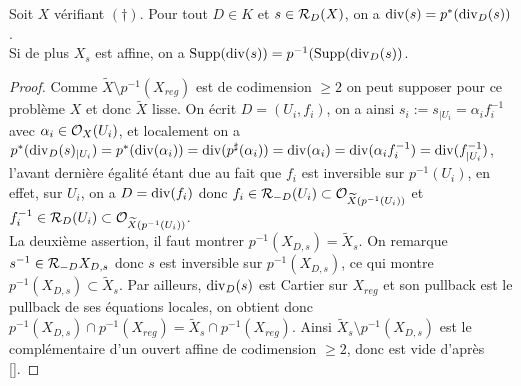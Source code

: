 \begin{prop}\label{pstarprincipal}
Soit $X$ vérifiant $(\dagger)$. Pour tout $D\in K$ et $s\in\mathcal{R}_D(X)$, on a $\operatorname{div}(s)=p^*(\operatorname{div}_D(s))$.\\ Si de plus $X_s$ est affine, on a $\operatorname{Supp}(\operatorname{div}(s))=p^{-1}(\operatorname{Supp}(\operatorname{div}_D(s))$.
\end{prop}
\begin{proof}
Comme $\widetilde{X}\setminus p^{-1}(X_{reg})$ est de codimension $\geq 2$ on peut supposer pour ce problème $X$ et donc $\widetilde{X}$ lisse. On écrit $D=(U_i, f_i)$, on a ainsi $s_i:=s_{|U_i}=\alpha_i f_i^{-1}$ avec $\alpha_i\in \mathcal{O}_X(U_i)$, et localement on a $p^*(\operatorname{div}_D(s)_{|U_i})=p^*(\operatorname{div}(\alpha_i))=\operatorname{div}(p^\sharp(\alpha_i))=\operatorname{div}(\alpha_i)=\operatorname{div}(\alpha_i f_i^{-1})=\operatorname{div}(f^{-1}_{|U_i})$, l'avant dernière égalité étant due au fait que $f_i$ est inversible sur $p^{-1}(U_i)$, en effet, sur $U_i$, on a $D=\operatorname{div}(f_i)$ donc $f_i\in \mathcal{R}_{-D}(U_i)\subset\mathcal{O}_{\widetilde{X}(p^{-1}(U_i))}$ et $f_i^{-1}\in \mathcal{R}_D(U_i)\subset\mathcal{O}_{\widetilde{X}(p^{-1}(U_i))}$.\\
La deuxième assertion, il faut montrer $p^{-1}(X_{D,s})=\widetilde{X}_s$. On remarque $s^{-1}\in \mathcal{R}_{-D}{X_{D,s}}$ donc $s$ est inversible sur $p^{-1}(X_{D,s})$, ce qui montre $p^{-1}(X_{D,s})\subset \widetilde{X}_s$. Par ailleurs, $\operatorname{div}_D(s)$ est Cartier sur $X_{reg}$ et son pullback est le pullback de ses équations locales, on obtient donc $p^{-1}(X_{D,s})\cap p^{-1}(X_{reg})=\widetilde{X}_s \cap p^{-1}(X_{reg})$. Ainsi $\widetilde{X}_s \setminus p^{-1}(X_{D,s})$ est le complémentaire d'un ouvert affine de codimension $\geq 2$, donc est vide d'après \ref{}.
\end{proof}

